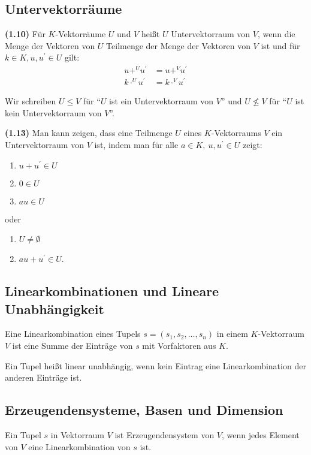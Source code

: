 \documentclass[a4paper,parskip=half*,DIV=15,fontsize=11pt]{scrartcl}
\newlength{\hangwidth}
\newcommand{\skript}[1]{\settowidth{\hangwidth}{\textbf{(#1)} }\hangpara{\hangwidth}{1}\textbf{(#1)} \ignorespaces} %
\begin{document}
\subsection{Untervektorräume}

\skript{1.10} Für $K$-Vektorräume $U$ und $V$ heißt $U$ Untervektorraum von $V$, wenn die Menge der Vektoren von $U$ Teilmenge der Menge der Vektoren von $V$ ist und für $k \in K, u,u^\prime \in U$ gilt:
\begin{align*}
	u {+}^{U} u^\prime &= u {+}^{V} u^\prime	\\
	k \cdot^{U} u^\prime &= k \cdot^{V} u^\prime
\end{align*}

Wir schreiben $U \leq V$ für ``$U$ ist ein Untervektorraum von $V$'' und $U \nleq V$ für ``$U$ ist kein Untervektorraum von $V$''.

\skript{1.13} Man kann zeigen, dass eine Teilmenge $U$ eines $K$-Vektorraums $V$ ein Untervektorraum von $V$ ist, indem man für alle $a \in K,\ u,u^\prime \in U$ zeigt:
\begin{enumerate}
	\item $u+u^\prime \in U$
	\item $0 \in U$
	\item $au \in U$
\end{enumerate}
oder
\begin{enumerate}
	\item $U \neq \emptyset$
	\item $au+u^\prime \in U$.
\end{enumerate}

\subsection{Linearkombinationen und Lineare Unabhängigkeit}

Eine Linearkombination eines Tupels $s = (s_1,s_2, \ldots, s_n)$ in einem $K$-Vektorraum $V$ ist eine Summe der Einträge von $s$ mit Vorfaktoren aus $K$.

Ein Tupel heißt linear unabhängig, wenn kein Eintrag eine Linearkombination der anderen Einträge ist.

\subsection{Erzeugendensysteme, Basen und Dimension}

Ein Tupel $s$ in Vektorraum $V$ ist Erzeugendensystem von $V$, wenn jedes Element von $V$ eine Linearkombination von $s$ ist.
\end{document}
